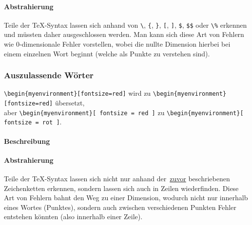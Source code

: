 \paragraph*{Abstrahierung}
Teile der \TeX{}-Syntax lassen sich anhand von \verb|\|, \verb|{|, \verb|}|, \verb|[|, \verb|]|, \verb|$|, \verb|$$| oder \verb|\%| erkennen und müssten daher ausgeschlossen werden. Man kann sich diese Art von Fehlern wie 0-dimensionale Fehler vorstellen, wobei die nullte Dimension hierbei bei einem einzelnen Wort beginnt (welche als Punkte zu verstehen sind).

\subsubsection{Auszulassende Wörter}\label{problems:dim1}%
\verb|\begin{myenvironment}[fontsize=red]| wird zu \verb|\begin{myenvironment}[fontsize=red]| übersetzt,\\aber \verb|\begin{myenvironment}[ fontsize = red ]| zu \verb|\begin{myenvironment}[ fontsize = rot ]|.
\paragraph*{Beschreibung}
\paragraph*{Abstrahierung}
Teile der \TeX-Syntax lassen sich nicht nur anhand der~\hyperref[problems:unexpectedCharacters]{zuvor} beschriebenen Zeichenketten erkennen, sondern lassen sich auch in Zeilen wiederfinden. Diese Art von Fehlern bahnt den Weg zu einer Dimension, wodurch nicht nur innerhalb eines Wortes (Punktes), sondern auch zwischen verschiedenen Punkten Fehler entstehen könnten (also innerhalb einer Zeile).

\newpage

